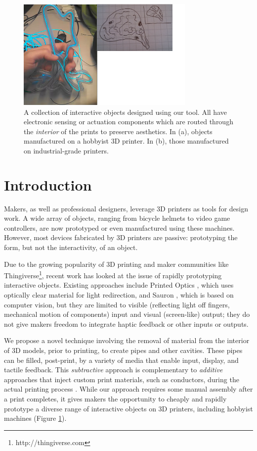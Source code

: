 \begin{figure}[h]
\centering
    \includegraphics[width=3.4in]{figures/placeholder/teaser.png}
\caption{A collection of interactive objects designed using our tool.  All have electronic sensing or actuation components which are routed through the \emph{interior} of the prints to preserve aesthetics.  In (a), objects manufactured on a hobbyist 3D printer.  In (b), those manufactured on industrial-grade printers. }
\label{fig:teaser}
\end{figure}

\section{Introduction}
Makers, as well as professional designers, leverage 3D printers as tools for design work.  A wide array of objects, ranging from bicycle helmets to video game controllers, are now prototyped or even manufactured using these machines.  However, most devices fabricated by 3D printers are passive: prototyping the form, but not the interactivity, of an object.  

Due to the growing popularity of 3D printing and maker communities like Thingiverse\footnote{http://thingiverse.com}, recent work has looked at the issue of rapidly prototyping interactive objects. Existing approaches include Printed Optics \cite{Willis-printedoptics}, which uses optically clear material for light redirection, and Sauron \cite{Savage-sauron}, which is based on computer vision, but they are limited to visible (reflecting light off fingers, mechanical motion of components) input and visual (screen-like) output; they do not give makers freedom to integrate haptic feedback or other inputs or outputs.

We propose a novel technique involving the removal of material from the interior of 3D models, prior to printing, to create pipes and other cavities.  These pipes can be filled, post-print, by a variety of media that enable input, display, and tactile feedback.  This {\em subtractive} approach is complementary to {\em additive} approaches that inject custom print materials, such as conductors, during the actual printing process \cite{Sells-reprap}. While our approach requires some manual assembly after a print completes, it gives makers the opportunity to cheaply and rapidly prototype a diverse range of interactive objects on 3D printers, including hobbyist machines (Figure \ref{fig:teaser}).

